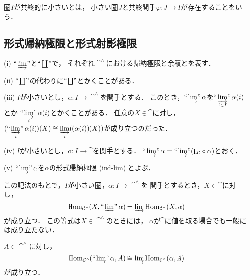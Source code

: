 \begin{Definition}
    圏$I$が共終的に小さいとは，
    小さい圏$J$と共終関手$\varphi\colon J\to I$が存在することをいう．
\end{Definition}

































\subsection{形式帰納極限と形式射影極限}
\begin{Notation}
    (i) 
    $\limf$と$\ind<\coprod>$で，
    それぞれ$\cat^\wedge$における帰納極限と余積とを表す．

    (ii) 
    $\ind<\coprod>$の代わりに$\ind<\bigsqcup>$とかくことがある．

    (iii) 
    $I$が小さいとし，$\alpha\colon I\to\cat^\wedge$を関手とする．
    このとき，$\limf\alpha$を$\ind<\varinjlim_{i\in I}>\alpha(i)$とか
    $\ind<\varinjlim_{i}>\alpha(i)$とかくことがある．
    任意の$X\in\cat$に対し，$(\ind<\varinjlim_{i}>\alpha(i))(X)
    \cong\varinjlim\limits_i((\alpha(i))(X))$が成り立つのだった．

    (iv) 
    $I$が小さいとし，$\alpha\colon I\to\cat$を関手とする．
    $\limf\alpha=\limf({\hh}_\cat\circ\alpha)$とおく．

    (v) 
    $\limf\alpha$を$\alpha$の形式帰納極限 (ind-lim) とよぶ．
\end{Notation}

この記法のもとで，$I$が小さい圏，$\alpha\colon I\to\cat^\wedge$を
関手とするとき，$X\in\cat$に対し，
\begin{equation}
    \Hom_{\cat^\wedge}(X,\limf\alpha)=\varinjlim\Hom_{\cat^\wedge}(X,\alpha)
\end{equation}
が成り立つ．
この等式は$X\in\cat^\wedge$のときには，
$\alpha$が$\cat$に値を取る場合でも一般には成り立たない．

$A\in\cat^\wedge$に対し，
\begin{equation*}
    \Hom_{\cat^\wedge}(\limf\alpha,A)\cong\varinjlim\Hom_{\cat^\wedge}(\alpha,A)
\end{equation*}
が成り立つ．


